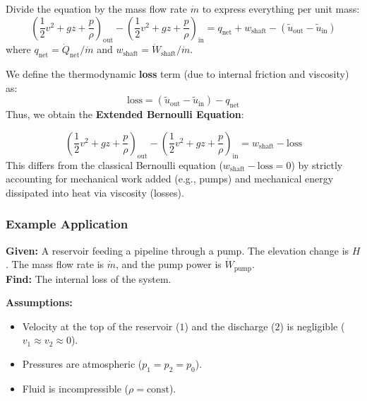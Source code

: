 Divide the equation by the mass flow rate $\dot{m}$ to express everything per unit mass:
\begin{equation}
    \left( \frac{1}{2}v^2 + gz + \frac{p}{\rho} \right)_{\text{out}} - \left( \frac{1}{2}v^2 + gz + \frac{p}{\rho} \right)_{\text{in}} = q_{\text{net}} + w_{\text{shaft}} - (\tilde{u}_{\text{out}} - \tilde{u}_{\text{in}})
\end{equation}
where $q_{\text{net}} = \dot{Q}_{\text{net}}/\dot{m}$ and $w_{\text{shaft}} = \dot{W}_{\text{shaft}}/\dot{m}$.

We define the thermodynamic \textbf{loss} term (due to internal friction and viscosity) as:
\begin{equation}
    \text{loss} = (\tilde{u}_{\text{out}} - \tilde{u}_{\text{in}}) - q_{\text{net}}
\end{equation}
Thus, we obtain the \textbf{Extended Bernoulli Equation}:
\begin{conceptbox}
\begin{equation}
    \left( \frac{1}{2}v^2 + gz + \frac{p}{\rho} \right)_{\text{out}} - \left( \frac{1}{2}v^2 + gz + \frac{p}{\rho} \right)_{\text{in}} = w_{\text{shaft}} - \text{loss}
\end{equation}
This differs from the classical Bernoulli equation ($w_{\text{shaft}} - \text{loss} = 0$) by strictly accounting for mechanical work added (e.g., pumps) and mechanical energy dissipated into heat via viscosity (losses).
\end{conceptbox}

\subsubsection{Example Application}

\textbf{Given:} A reservoir feeding a pipeline through a pump. The elevation change is $H$. The mass flow rate is $\dot{m}$, and the pump power is $\dot{W}_{\text{pump}}$. \\
\textbf{Find:} The internal loss of the system.

\textbf{Assumptions:}
\begin{itemize}
    \item Velocity at the top of the reservoir ($1$) and the discharge ($2$) is negligible ($v_1 \approx v_2 \approx 0$).
    \item Pressures are atmospheric ($p_1 = p_2 = p_0$).
    \item Fluid is incompressible ($\rho = \text{const}$).
\end{itemize}

